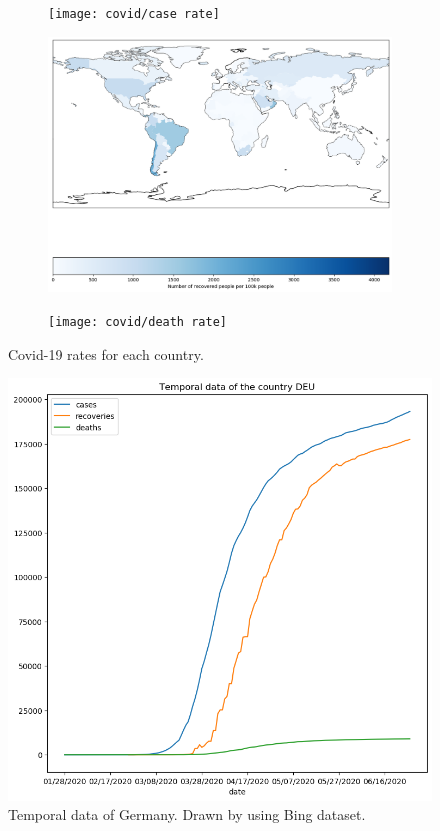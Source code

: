 \begin{figure}[h]
	\centering
	\begin{subfigure}[b]{0.47\linewidth}
		\texttt{[image: covid/case rate]}
	\end{subfigure}
	\begin{subfigure}[b]{0.47\linewidth}
		\includegraphics[width=\linewidth]{covid/recovered rate}
	\end{subfigure}
	\begin{subfigure}[b]{0.47\linewidth}
		\texttt{[image: covid/death rate]}
	\end{subfigure}
	\caption{Covid-19 rates for each country.}
\end{figure}


\begin{figure}[h]
	\centering
	\includegraphics[width=0.50\linewidth]{covid/DEU}
	\caption{Temporal data of Germany. Drawn by using Bing dataset.}
\end{figure}


